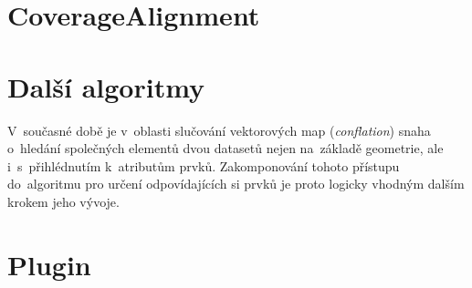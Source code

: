 

\section{CoverageAlignment}
\label{ca-vyvoj}







\section{Další algoritmy}



V~současné době je v~oblasti slučování vektorových map 
(\textit{conflation}) snaha o~hledání společných elementů 
dvou datasetů nejen na~základě geometrie, ale i~s~přihlédnutím
k~atributům prvků. Zakomponování tohoto přístupu do~algoritmu 
pro určení odpovídajících si prvků je proto logicky vhodným 
dalším krokem jeho vývoje.

\section{Plugin}
